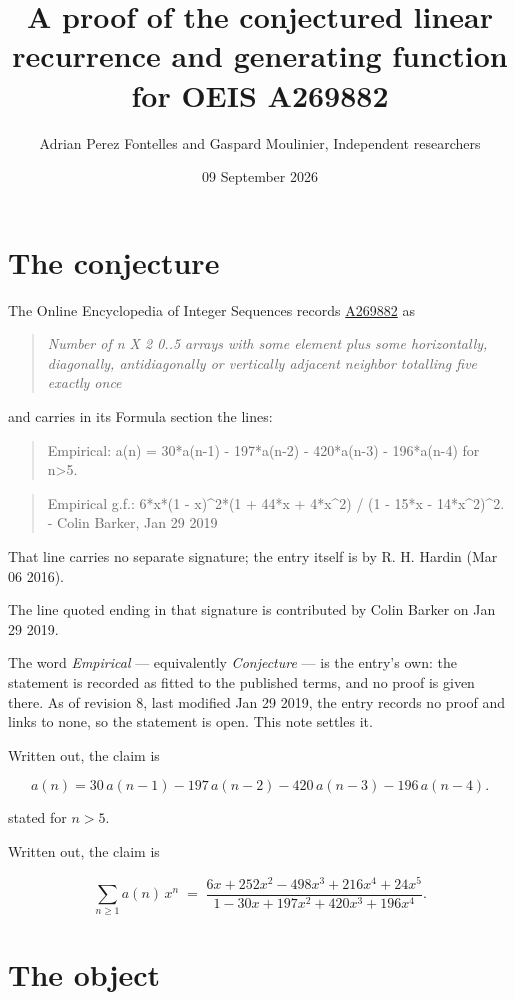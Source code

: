 \documentclass[11pt]{article}
\title{A proof of the conjectured linear recurrence and generating function for OEIS A269882}
\author{Adrian Perez Fontelles and Gaspard Moulinier, Independent researchers}
\date{09 September 2026}
\theoremstyle{definition}
\begin{document}
\maketitle
\section{The conjecture}

The Online Encyclopedia of Integer Sequences records \href{https://oeis.org/A269882}{A269882} as

\begin{quote}\itshape Number of n X 2 0..5 arrays with some element plus some horizontally, diagonally, antidiagonally or vertically adjacent neighbor totalling five exactly once\end{quote}

and carries in its Formula section the lines:

\begin{quote}\ttfamily Empirical: a(n) = 30*a(n-1) - 197*a(n-2) - 420*a(n-3) - 196*a(n-4) for n>5.\end{quote}

\begin{quote}\ttfamily Empirical g.f.: 6*x*(1 - x)\textasciicircum{}2*(1 + 44*x + 4*x\textasciicircum{}2) / (1 - 15*x - 14*x\textasciicircum{}2)\textasciicircum{}2. - Colin Barker, Jan 29 2019\end{quote}

That line carries no separate signature; the entry itself is by R. H. Hardin (Mar 06 2016).

The line quoted ending in that signature is contributed by Colin Barker on Jan 29 2019.

The word {\itshape Empirical} --- equivalently {\itshape Conjecture} --- is the entry's own: the statement is recorded as fitted to the published terms, and no proof is given there. As of revision 8, last modified Jan 29 2019, the entry records no proof and links to none, so the statement is open. This note settles it.

Written out, the claim is

\[a(n) = 30\,a(n-1) - 197\,a(n-2) - 420\,a(n-3) - 196\,a(n-4).\]

stated for $n > 5$.

Written out, the claim is

\[\sum_{n \ge 1} a(n)\,x^n \;=\; \frac{6x + 252x^{2} - 498x^{3} + 216x^{4} + 24x^{5}}{1 - 30x + 197x^{2} + 420x^{3} + 196x^{4}}.\]

\section{The object}
\end{document}
